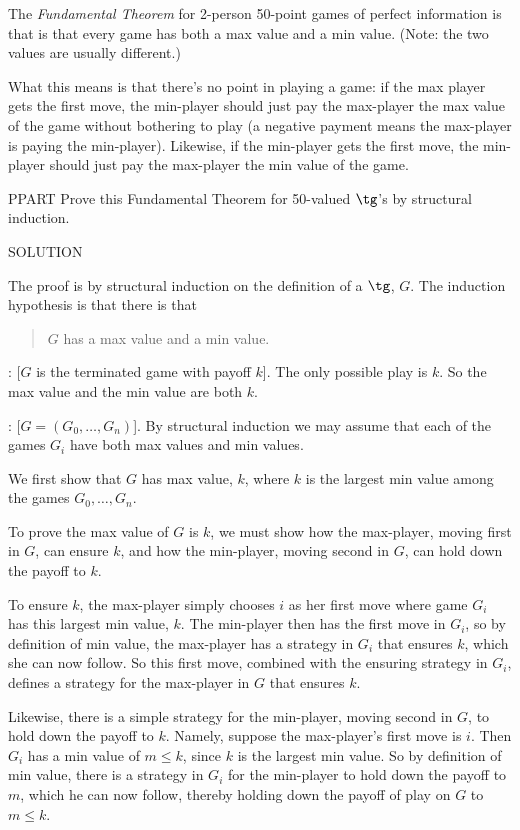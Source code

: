 The \emph{Fundamental Theorem} for 2-person 50-point games of perfect
information is that is that every game has both a max value and a min
value.  (Note: the two values are usually different.)

What this means is that there's no point in playing a game: if the max
player gets the first move, the min-player should just pay the max-player
the max value of the game without bothering to play (a negative payment
means the max-player is paying the min-player).  Likewise, if the
min-player gets the first move, the min-player should just pay the
max-player the min value of the game.

PPART\label{finpg} Prove this Fundamental Theorem for 50-valued
$\tg$'s by structural induction.

SOLUTION

The proof is by structural induction on the definition of a
  $\tg$, $G$.  The induction hypothesis is that there is that
\begin{quote}
  $G$ has a max value and a min value.
\end{quote}

: [$G$ is the terminated game with payoff $k$].  The only
possible play is $k$.  So the max value and the min value are both $k$.

: [$G = (G_0,\dots, G_n)$].  By structural
induction we may assume that each of the games $G_i$ have both max values
and min values.

We first show that $G$ has max value, $k$, where $k$ is the largest min
value among the games $G_0,\dots,G_n$.

To prove the max value of $G$ is $k$, we must show how the max-player,
moving first in $G$, can ensure $k$, and how the min-player, moving second
in $G$, can hold down the payoff to $k$.

To ensure $k$, the max-player simply chooses $i$ as her first move where
game $G_i$ has this largest min value, $k$.  The min-player then has the
first move in $G_i$, so by definition of min value, the max-player has a
strategy in $G_i$ that ensures $k$, which she can now follow.  So this
first move, combined with the ensuring strategy in $G_i$, defines a
strategy for the max-player in $G$ that ensures $k$.

Likewise, there is a simple strategy for the min-player, moving second in
$G$, to hold down the payoff to $k$.  Namely, suppose the max-player's
first move is $i$.  Then $G_i$ has a min value of $m \leq k$, since $k$ is
the largest min value.  So by definition of min value, there is a strategy
in $G_i$ for the min-player to hold down the payoff to $m$, which he can
now follow, thereby holding down the payoff of play on $G$ to $m \leq k$.

